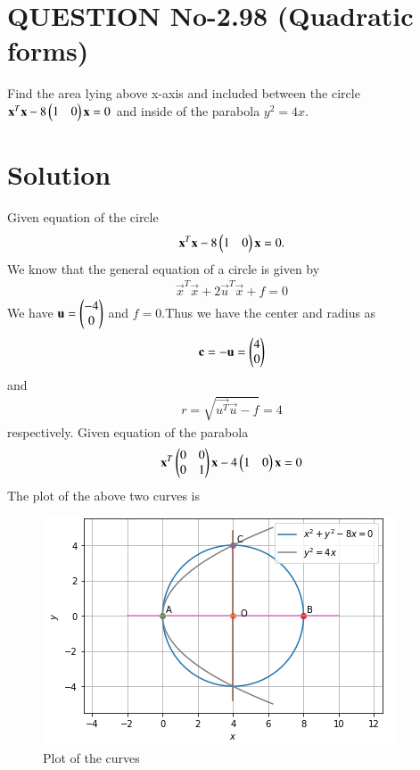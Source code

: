 \documentclass[journal,12pt,twocolumn]{IEEEtran}
\begin{document}
\section{QUESTION No-2.98 (Quadratic forms)}
\item Find the area lying above x-axis and included between the circle $\mathbf{x}^T\mathbf{x}-8\begin{pmatrix}1 & 0\end{pmatrix}\mathbf{x}=0$  and inside of the parabola $y^2 = 4x$.
%

%
\section{Solution}
Given equation of the circle 
\begin{align}
 \mathbf{x}^T\mathbf{x}-8\begin{pmatrix}1 & 0\end{pmatrix}\mathbf{x}=0.  
\end{align}
We know that the general equation of a circle is given by
\begin{align}
  \vec{x}^T\vec{x}+2\vec{u}^T\vec{x}+f=0  
\end{align}
We have $\mathbf{u} = \begin{pmatrix}-4 \\ 0\end{pmatrix}$ and $f = 0$.Thus we have the center and radius as 
\begin{align}
\mathbf{c} = -\mathbf{u} = \begin{pmatrix}4 \\ 0\end{pmatrix}
\end{align} and 
\begin{align}
r= \sqrt{\vec{u^T}\vec{u} - f} = 4
\end{align} respectively.
Given equation of the parabola 
\begin{align}
 \mathbf{x}^T\begin{pmatrix}0&0 \\ 0&1\end{pmatrix}\mathbf{x}-4\begin{pmatrix}1&0\end{pmatrix}\mathbf{x}=0   
\end{align}
The plot of the above two curves is
\begin{figure}[ht]
\centering
\includegraphics[width=\columnwidth]{Area.PNG}
\caption{Plot of the curves}
\label{Plot of the curves}
\end{figure}
\end{document}
